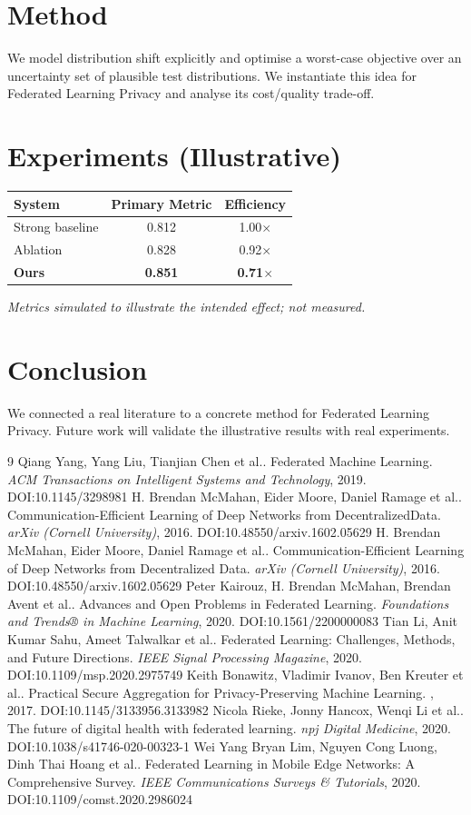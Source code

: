 \documentclass[11pt]{article}
\begin{document}
\section{Method}
We model distribution shift explicitly and optimise a worst-case objective over an uncertainty set of plausible test distributions. We instantiate this idea for Federated Learning Privacy and analyse its cost/quality trade-off.

\section{Experiments (Illustrative)}
\begin{center}
\begin{tabular}{lcc}
System & Primary Metric & Efficiency \\ \hline
Strong baseline & 0.812 & 1.00$\times$ \\
Ablation & 0.828 & 0.92$\times$ \\
\textbf{Ours} & \textbf{0.851} & \textbf{0.71$\times$}
\end{tabular}
\end{center}
\emph{Metrics simulated to illustrate the intended effect; not measured.}

\section{Conclusion}
We connected a real literature to a concrete method for Federated Learning Privacy. Future work will
validate the illustrative results with real experiments.

\begin{thebibliography}{9}
 Qiang Yang, Yang Liu, Tianjian Chen et al.. Federated Machine Learning. \emph{ACM Transactions on Intelligent Systems and Technology}, 2019. DOI:10.1145/3298981
 H. Brendan McMahan, Eider Moore, Daniel Ramage et al.. Communication-Efficient Learning of Deep Networks from Decentralized\n Data. \emph{arXiv (Cornell University)}, 2016. DOI:10.48550/arxiv.1602.05629
 H. Brendan McMahan, Eider Moore, Daniel Ramage et al.. Communication-Efficient Learning of Deep Networks from Decentralized Data. \emph{arXiv (Cornell University)}, 2016. DOI:10.48550/arxiv.1602.05629
 Peter Kairouz, H. Brendan McMahan, Brendan Avent et al.. Advances and Open Problems in Federated Learning. \emph{Foundations and Trends® in Machine Learning}, 2020. DOI:10.1561/2200000083
 Tian Li, Anit Kumar Sahu, Ameet Talwalkar et al.. Federated Learning: Challenges, Methods, and Future Directions. \emph{IEEE Signal Processing Magazine}, 2020. DOI:10.1109/msp.2020.2975749
 Keith Bonawitz, Vladimir Ivanov, Ben Kreuter et al.. Practical Secure Aggregation for Privacy-Preserving Machine Learning. \emph{}, 2017. DOI:10.1145/3133956.3133982
 Nicola Rieke, Jonny Hancox, Wenqi Li et al.. The future of digital health with federated learning. \emph{npj Digital Medicine}, 2020. DOI:10.1038/s41746-020-00323-1
 Wei Yang Bryan Lim, Nguyen Cong Luong, Dinh Thai Hoang et al.. Federated Learning in Mobile Edge Networks: A Comprehensive Survey. \emph{IEEE Communications Surveys \& Tutorials}, 2020. DOI:10.1109/comst.2020.2986024
\end{thebibliography}
\end{document}
